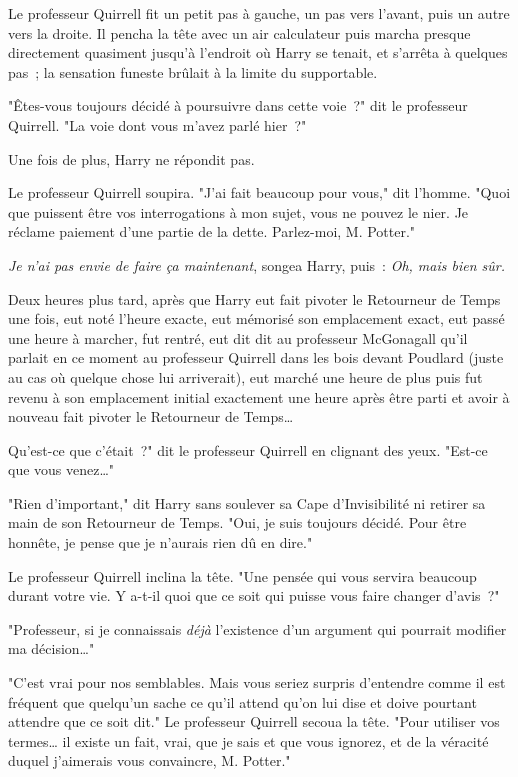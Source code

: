 Le professeur Quirrell fit un petit pas à gauche, un pas vers l'avant, puis un autre vers la droite. Il pencha la tête avec un air calculateur puis marcha presque directement quasiment jusqu'à l'endroit où Harry se tenait, et s'arrêta à quelques pas~; la sensation funeste brûlait à la limite du supportable.

"Êtes-vous toujours décidé à poursuivre dans cette voie~?" dit le professeur Quirrell. "La voie dont vous m'avez parlé hier~?"

Une fois de plus, Harry ne répondit pas.

Le professeur Quirrell soupira. "J'ai fait beaucoup pour vous," dit l'homme. "Quoi que puissent être vos interrogations à mon sujet, vous ne pouvez le nier. Je réclame paiement d'une partie de la dette. Parlez-moi, M. Potter."

\emph{Je n'ai pas envie de faire ça maintenant}, songea Harry, puis~: \emph{Oh, mais bien sûr.}

\later

Deux heures plus tard, après que Harry eut fait pivoter le Retourneur de Temps une fois, eut noté l'heure exacte, eut mémorisé son emplacement exact, eut passé une heure à marcher, fut rentré, eut dit dit au professeur McGonagall qu'il parlait en ce moment au professeur Quirrell dans les bois devant Poudlard (juste au cas où quelque chose lui arriverait), eut marché une heure de plus puis fut revenu à son emplacement initial exactement une heure après être parti et avoir à nouveau fait pivoter le Retourneur de Temps…

\later

Qu'est-ce que c'était~?" dit le professeur Quirrell en clignant des yeux. "Est-ce que vous venez…"

"Rien d'important," dit Harry sans soulever sa Cape d'Invisibilité ni retirer sa main de son Retourneur de Temps. "Oui, je suis toujours décidé. Pour être honnête, je pense que je n'aurais rien dû en dire."

Le professeur Quirrell inclina la tête. "Une pensée qui vous servira beaucoup durant votre vie. Y a-t-il quoi que ce soit qui puisse vous faire changer d'avis~?"

"Professeur, si je connaissais \emph{déjà} l'existence d'un argument qui pourrait modifier ma décision…"

"C'est vrai pour nos semblables. Mais vous seriez surpris d'entendre comme il est fréquent que quelqu'un sache ce qu'il attend qu'on lui dise et doive pourtant attendre que ce soit dit." Le professeur Quirrell secoua la tête. "Pour utiliser vos termes… il existe un fait, vrai, que je sais et que vous ignorez, et de la véracité duquel j'aimerais vous convaincre, M. Potter."

